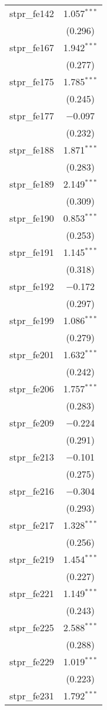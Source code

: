 \begin{table}[!htbp]
\begin{tabular}{@{\extracolsep{5pt}}lc}
  stpr\_fe142 & 1.057$^{***}$ \\ 
  & (0.296) \\ 
  stpr\_fe167 & 1.942$^{***}$ \\ 
  & (0.277) \\ 
  stpr\_fe175 & 1.785$^{***}$ \\ 
  & (0.245) \\ 
  stpr\_fe177 & $-$0.097 \\ 
  & (0.232) \\ 
  stpr\_fe188 & 1.871$^{***}$ \\ 
  & (0.283) \\ 
  stpr\_fe189 & 2.149$^{***}$ \\ 
  & (0.309) \\ 
  stpr\_fe190 & 0.853$^{***}$ \\ 
  & (0.253) \\ 
  stpr\_fe191 & 1.145$^{***}$ \\ 
  & (0.318) \\ 
  stpr\_fe192 & $-$0.172 \\ 
  & (0.297) \\ 
  stpr\_fe199 & 1.086$^{***}$ \\ 
  & (0.279) \\ 
  stpr\_fe201 & 1.632$^{***}$ \\ 
  & (0.242) \\ 
  stpr\_fe206 & 1.757$^{***}$ \\ 
  & (0.283) \\ 
  stpr\_fe209 & $-$0.224 \\ 
  & (0.291) \\ 
  stpr\_fe213 & $-$0.101 \\ 
  & (0.275) \\ 
  stpr\_fe216 & $-$0.304 \\ 
  & (0.293) \\ 
  stpr\_fe217 & 1.328$^{***}$ \\ 
  & (0.256) \\ 
  stpr\_fe219 & 1.454$^{***}$ \\ 
  & (0.227) \\ 
  stpr\_fe221 & 1.149$^{***}$ \\ 
  & (0.243) \\ 
  stpr\_fe225 & 2.588$^{***}$ \\ 
  & (0.288) \\ 
  stpr\_fe229 & 1.019$^{***}$ \\ 
  & (0.223) \\ 
  stpr\_fe231 & 1.792$^{***}$ \\ 

\end{tabular}
\end{table}
